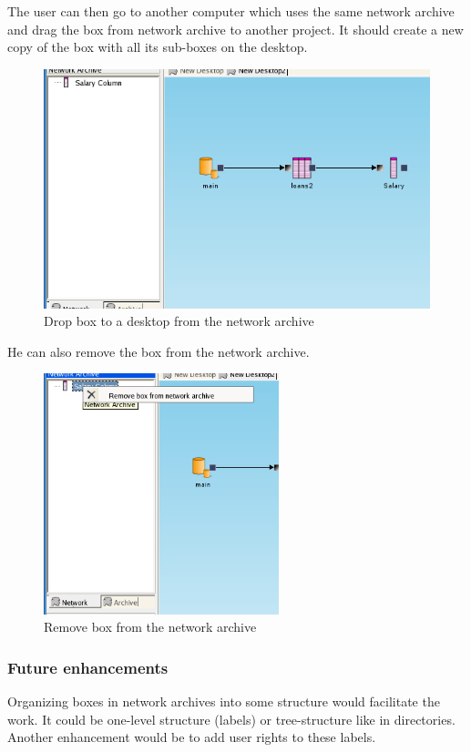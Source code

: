 \documentclass[a4paper,12pt]{book}
\begin{document}
The user can then go to another computer which uses the same network archive and drag the box from network archive to another project. It should create a new copy of the box with all its sub-boxes on the desktop.
\begin{figure}
	\includegraphics[width=13.72cm]{network_archive_drop_to_desktop}
	\caption{Drop box to a desktop from the network archive}
\end{figure}
He can also remove the box from the network archive.
\begin{figure}
	\includegraphics[height=7cm]{network_archive_remove_box}
	\caption{Remove box from the network archive}
\end{figure}

\subsubsection{Future enhancements}
Organizing boxes in network archives into some structure would facilitate the work. It could be one-level structure (labels) or tree-structure like in directories. Another enhancement would be to add user rights to these labels.
\end{document}
